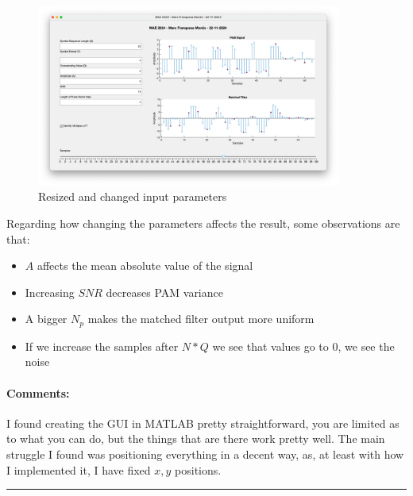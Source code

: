 \begin{figure}[H]
\centering
\includegraphics[width=10cm]{figures/3.png}
\caption{Resized and changed input parameters}
\label{fig:figures/3.png}
\end{figure}

Regarding how changing the parameters affects the result, some
observations are that:

\begin{itemize}
\item $ A $ affects the mean absolute value of the signal
\item Increasing $ SNR $ decreases PAM variance
\item A bigger $ N_p $ makes the matched filter output more uniform
\item If we increase the samples after $ N * Q $ we see that values
go to 0, we see the noise
\end{itemize}

\paragraph{Comments:}

I found creating the GUI in MATLAB pretty straightforward, you are
limited as to what you can do, but the things that are there work pretty well.
The main struggle I found was positioning everything in a decent way,
as, at least with how I implemented it, I have fixed $ x,y $ positions.

\bigskip
\hrule
